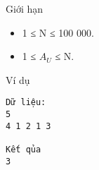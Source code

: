 Giới hạn  
\begin{itemize}
	\item     1 ≤ N ≤ 100 000.   
	\item     1 ≤ $A_{U}$    ≤ N.   
\end{itemize}
   Ví dụ  
\begin{verbatim}
Dữ liệu:
5
4 1 2 1 3

Kết qủa
3
\end{verbatim}